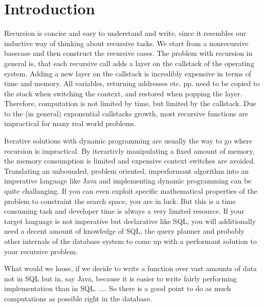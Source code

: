 \chapter{Introduction}\label{Introduction}


Recursion is concise and easy to understand and write, since it resembles our inductive way of thinking about recursive tasks. We start from a nonrecursive basecase and then construct the recursive cases. The problem with recursion in general is, that each recursive call adds a layer on the callstack of the operating system. Adding a new layer on the callstack is incredibly expensive in terms of time and memory. All variables, returning addresses etc. pp. need to be copied to the stack when switching the context, and restored when popping the layer. Therefore, computation is not limited by time, but limited by the callstack. Due to the (in general) exponential callstacks growth, most recursive functions are impractical for many real world problems.

Iterative solutions with dynamic programming are usually the way to go where recursion is impractical. By iterartivly manipulating a fixed amount of memory, the memory consumption is limited and expensive context switches are avoided. Translating an unbounded, problem oriented, imperformant algorithm into an imperative language like Java and implementing dynamic programming can be quite challanging. If you can even exploit specific mathematical properties of the problem to constraint the search space, you are in luck. But this is a time consuming task and developer time is always a very limited resource. If your target language is not imperative but declarative like SQL, you will additionally need a decent amount of knowledge of SQL, the query planner and probably other internals of the database system to come up with a performant solution to your recursive problem.

What would we loose, if we decide to write a function over vast amounts of data not in SQL but in, say Java, because it is easier to write fairly performing implementation than in SQL.
....
So there is a good point to do as much computations as possible right in the database.





